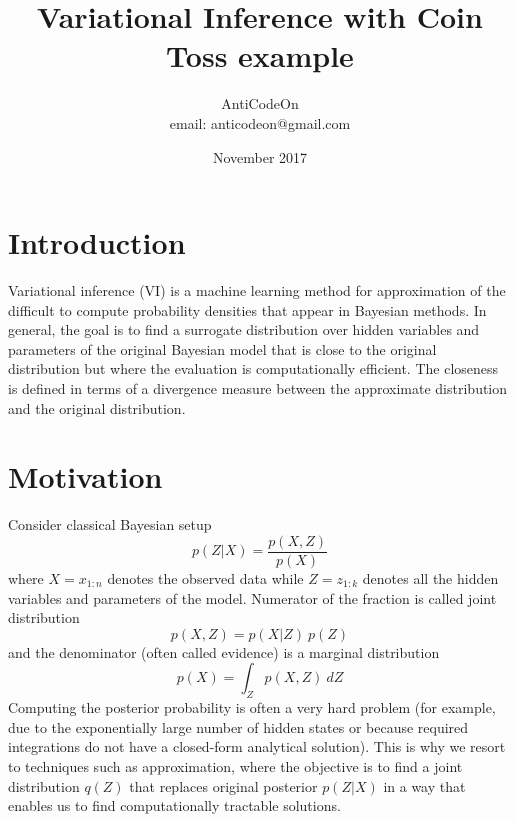 \documentclass{article}
\title{Variational Inference with Coin Toss example}
\author{AntiCodeOn \\ email: {anticodeon@gmail.com}  }
\date{November 2017}
\begin{document}
\maketitle

\section{Introduction}
Variational inference (VI) is a machine learning method for approximation of the difficult to compute probability densities that appear in Bayesian methods. In general, the goal is to find a surrogate distribution over hidden variables and parameters of the original Bayesian model that is close to the original distribution but where the evaluation is computationally efficient. The closeness is defined in terms of a divergence measure between the approximate distribution and the original distribution. 

\section{Motivation}
Consider classical Bayesian setup 
\begin{equation}\label{BayesEq}
p(Z|X) = \frac{p(X,Z)}{p(X)}
\end{equation}
where $X=x_{1:n}$ denotes the observed data while $Z=z_{1:k}$ denotes all the hidden variables and parameters of the model. Numerator of the fraction is called joint distribution
\begin{equation}
    p(X,Z) = p(X|Z)\:p(Z)
\end{equation}
and the denominator (often called evidence) is a marginal distribution
\begin{equation}
    p(X)=\int_{Z}p(X,Z)\:dZ
\end{equation}
Computing the posterior probability is often a very hard problem (for example, due to the exponentially large number of hidden states or because required integrations do not have a closed-form analytical solution). This is why we resort to techniques such as approximation, where the objective is to find a joint distribution $q(Z)$ that replaces original posterior $p(Z|X)$ in a way that enables us to find computationally tractable solutions.
\end{document}
